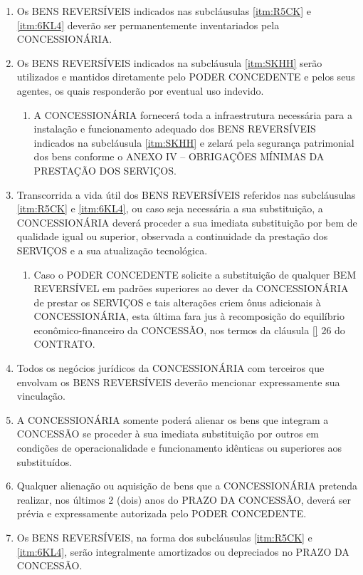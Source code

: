 \documentclass[a4paper,11pt]{report} %
\begin{document}
\begin{enumerate}
\item \label{itm:WB67} Os BENS REVERSÍVEIS indicados nas subcláusulas \ref{itm:R5CK} e \ref{itm:6KL4} deverão ser permanentemente inventariados pela CONCESSIONÁRIA.

\item \label{itm:SJRF} Os BENS REVERSÍVEIS indicados na subcláusula \ref{itm:SKHH} serão utilizados e mantidos diretamente pelo PODER CONCEDENTE e pelos seus agentes, os quais responderão por eventual uso indevido.

\begin{enumerate}[label*=\arabic*.]
\item \label{itm:4JAZ} A CONCESSIONÁRIA fornecerá toda a infraestrutura necessária para a instalação e funcionamento adequado dos BENS REVERSÍVEIS indicados na subcláusula \ref{itm:SKHH} e zelará pela segurança patrimonial dos bens conforme o ANEXO IV – OBRIGAÇÕES MÍNIMAS DA PRESTAÇÃO DOS SERVIÇOS.
\end{enumerate}

\item \label{itm:T8P9} Transcorrida a vida útil dos BENS REVERSÍVEIS referidos nas subcláusulas \ref{itm:R5CK} e \ref{itm:6KL4}, ou caso seja necessária a sua substituição, a CONCESSIONÁRIA deverá proceder a sua imediata substituição por bem de qualidade igual ou superior, observada a continuidade da prestação dos SERVIÇOS e a sua atualização tecnológica.

\begin{enumerate}[label*=\arabic*.]
\item \label{itm:MH6K} Caso o PODER CONCEDENTE solicite a substituição de qualquer BEM REVERSÍVEL em padrões superiores ao dever da CONCESSIONÁRIA de prestar os SERVIÇOS e tais alterações criem ônus adicionais à CONCESSIONÁRIA, esta última fara jus à recomposição do equilíbrio econômico-financeiro da CONCESSÃO, nos termos da cláusula \ref{} 26 do CONTRATO.
\end{enumerate}

\item \label{itm:P87Z} Todos os negócios jurídicos da CONCESSIONÁRIA com terceiros que envolvam os BENS REVERSÍVEIS deverão mencionar expressamente sua vinculação.

\item \label{item:R5CK} A CONCESSIONÁRIA somente poderá alienar os bens que integram a CONCESSÃO se proceder à sua imediata substituição por outros em condições de operacionalidade e funcionamento idênticas ou superiores aos substituídos. 

\item \label{itm:6KL4} Qualquer alienação ou aquisição de bens que a CONCESSIONÁRIA pretenda realizar, nos últimos 2 (dois) anos do PRAZO DA CONCESSÃO, deverá ser prévia e expressamente autorizada pelo PODER CONCEDENTE. 

\item \label{itm:SKHH} Os BENS REVERSÍVEIS, na forma dos subcláusulas \ref{itm:R5CK} e \ref{itm:6KL4}, serão integralmente amortizados ou depreciados no PRAZO DA CONCESSÃO.

\end{enumerate}
\end{document}
